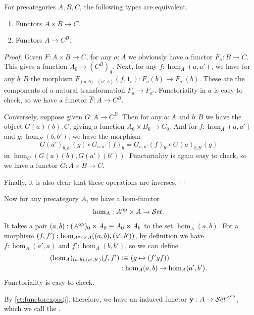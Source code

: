 \begin{lem}\label{ct:functorexpadj}
  For precategories $A,B,C$, the following types are equivalent.
  \begin{enumerate}
  \item Functors $A\times B\to C$.
  \item Functors $A\to C^B$.
  \end{enumerate}
\end{lem}
\begin{proof}
  Given $F:A\times B\to C$, for any $a:A$ we obviously have a functor $F_a : B\to C$.
  This gives a function $A_0 \to (C^B)_0$.
  Next, for any $f:\hom_A(a,a')$, we have for any $b:B$ the morphism $F_{(a,b),(a',b)}(f,1_b):F_a(b) \to F_{a'}(b)$.
  These are the components of a natural transformation $F_a \to F_{a'}$.
  Functoriality in $a$ is easy to check, so we have a functor $\hat{F}:A\to C^B$.

  Conversely, suppose given $G:A\to C^B$.
  Then for any $a:A$ and $b:B$ we have the object $G(a)(b):C$, giving a function $A_0 \times B_0 \to C_0$.
  And for $f:\hom_A(a,a')$ and $g:\hom_B(b,b')$, we have the morphism
  \begin{equation*}
     G(a')_{b,b'}(g)\circ G_{a,a'}(f)_b = G_{a,a'}(f)_{b'} \circ  G(a)_{b,b'}(g)
  \end{equation*}
  in $\hom_C(G(a)(b), G(a')(b'))$.
  Functoriality is again easy to check, so we have a functor $\check{G}:A\times B \to C$.

  Finally, it is also clear that these operations are inverses.
\end{proof}

Now for any precategory $A$, we have a hom-functor
%
\[\hom_A : A^{\mathrm{op}} \times A \to \mathcal{S}et.\]
It takes a pair $(a,b): (A^{\mathrm{op}})_0 \times A_0 \equiv A_0 \times A_0$ to the set $\hom_A(a,b)$.
For a morphism $(f,f') : \hom_{A^{\mathrm{op}}\times A}((a,b),(a',b'))$, by definition we have $f:\hom_A(a',a)$ and $f':\hom_A(b,b')$, so we can define
\begin{align*}
  (\hom_A)_{(a,b),(a',b')}(f,f')
  &\vcentcolon\equiv (g \mapsto (f'gf))\\
  &: \hom_A(a,b) \to \hom_A(a',b').
\end{align*}
Functoriality is easy to check.

By \cref{ct:functorexpadj}, therefore, we have an induced functor $\mathbf{y}:A\to \mathcal{S}et^{A^{\mathrm{op}}}$, which we call the .
%
%

